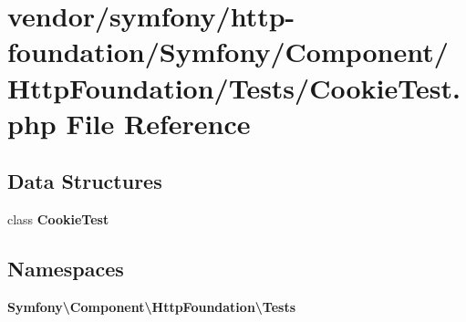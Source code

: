 \section{vendor/symfony/http-\/foundation/\+Symfony/\+Component/\+Http\+Foundation/\+Tests/\+Cookie\+Test.php File Reference}
\label{_cookie_test_8php}
\subsection*{Data Structures}
\begin{DoxyCompactItemize}
\item 
class {\bf Cookie\+Test}
\end{DoxyCompactItemize}
\subsection*{Namespaces}
\begin{DoxyCompactItemize}
\item 
 {\bf Symfony\textbackslash{}\+Component\textbackslash{}\+Http\+Foundation\textbackslash{}\+Tests}
\end{DoxyCompactItemize}
